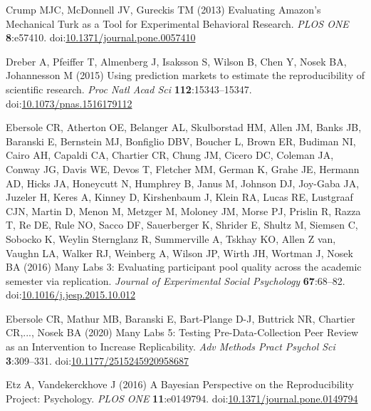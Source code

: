\documentclass[
  english,
  a4paper,
]{article}
\newlength{\cslhangindent}
\newlength{\cslentryspacingunit} %
\newenvironment{CSLReferences}[2] %
 {%
  \setlength{\parindent}{0pt}
  \ifodd #1
  \let\oldpar\par
  \def\par{\hangindent=\cslhangindent\oldpar}
  \fi
  \setlength{\parskip}{#2\cslentryspacingunit}
 }%
 {}
\begin{document}
\begin{CSLReferences}{1}{0}
\leavevmode{}%
Crump MJC, McDonnell JV, Gureckis TM (2013) Evaluating {Amazon}'s {Mechanical Turk} as a {Tool} for {Experimental Behavioral Research}. \emph{PLOS ONE} \textbf{8}:e57410. doi:\href{https://doi.org/10.1371/journal.pone.0057410}{10.1371/journal.pone.0057410}

\leavevmode{}%
Dreber A, Pfeiffer T, Almenberg J, Isaksson S, Wilson B, Chen Y, Nosek BA, Johannesson M (2015) Using prediction markets to estimate the reproducibility of scientific research. \emph{Proc Natl Acad Sci} \textbf{112}:15343--15347. doi:\href{https://doi.org/10.1073/pnas.1516179112}{10.1073/pnas.1516179112}

\leavevmode{}%
Ebersole CR, Atherton OE, Belanger AL, Skulborstad HM, Allen JM, Banks JB, Baranski E, Bernstein MJ, Bonfiglio DBV, Boucher L, Brown ER, Budiman NI, Cairo AH, Capaldi CA, Chartier CR, Chung JM, Cicero DC, Coleman JA, Conway JG, Davis WE, Devos T, Fletcher MM, German K, Grahe JE, Hermann AD, Hicks JA, Honeycutt N, Humphrey B, Janus M, Johnson DJ, Joy-Gaba JA, Juzeler H, Keres A, Kinney D, Kirshenbaum J, Klein RA, Lucas RE, Lustgraaf CJN, Martin D, Menon M, Metzger M, Moloney JM, Morse PJ, Prislin R, Razza T, Re DE, Rule NO, Sacco DF, Sauerberger K, Shrider E, Shultz M, Siemsen C, Sobocko K, Weylin Sternglanz R, Summerville A, Tskhay KO, Allen Z van, Vaughn LA, Walker RJ, Weinberg A, Wilson JP, Wirth JH, Wortman J, Nosek BA (2016) Many {Labs} 3: {Evaluating} participant pool quality across the academic semester via replication. \emph{Journal of Experimental Social Psychology} \textbf{67}:68--82. doi:\href{https://doi.org/10.1016/j.jesp.2015.10.012}{10.1016/j.jesp.2015.10.012}

\leavevmode{}%
Ebersole CR, Mathur MB, Baranski E, Bart-Plange D-J, Buttrick NR, Chartier CR,..., Nosek BA (2020) Many {Labs} 5: {Testing Pre-Data-Collection Peer Review} as an {Intervention} to {Increase Replicability}. \emph{Adv Methods Pract Psychol Sci} \textbf{3}:309--331. doi:\href{https://doi.org/10.1177/2515245920958687}{10.1177/2515245920958687}

\leavevmode{}%
Etz A, Vandekerckhove J (2016) A {Bayesian Perspective} on the {Reproducibility Project}: {Psychology}. \emph{PLOS ONE} \textbf{11}:e0149794. doi:\href{https://doi.org/10.1371/journal.pone.0149794}{10.1371/journal.pone.0149794}


\end{CSLReferences}
\end{document}
